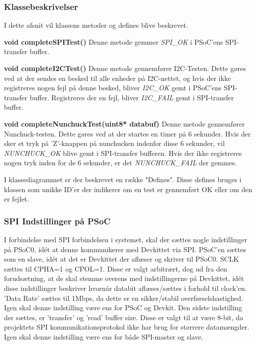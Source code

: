 \subsubsection{Klassebeskrivelser}
I dette afsnit vil klassens metoder og defines blive beskrevet.
\newline

\noindent\textbf{void completeSPITest()} \newline
Denne metode gemmer \textit{SPI\_OK} i PSoC'ens SPI-transfer buffer. \newline

\noindent\textbf{void completeI2CTest()} \newline
Denne metode gennemfører I2C-Testen. Dette gøres ved at der sendes en besked til alle enheder på I2C-nettet, og hvis der ikke registreres nogen fejl på denne besked, bliver \textit{I2C\_OK} gemt i PSoC'ens SPI-transfer buffer. Registreres der en fejl, bliver \textit{I2C\_FAIL} gemt i SPI-transfer buffer. \newline

\noindent\textbf{void completeNunchuckTest(uint8* databuf)} \newline
Denne metode gennemfører Nunchuck-testen. Dette gøres ved at der startes en timer på 6 sekunder. Hvis der sker et tryk på 'Z'-knappen på nunchucken indenfor disse 6 sekunder, vil \textit{NUNCHUCK\_OK} blive gemt i SPI-transfer bufferen. Hvis der ikke registreres nogen tryk inden for de 6 sekunder, er det \textit{NUNCHUCK\_FAIL} der gemmes.\newline

I klassediagrammet er der beskrevet en række "Defines". Disse defines bruges i klassen som unikke ID'er der indikerer om en test er gennemført OK eller om den er fejlet.

\subsubsection{SPI Indstillinger på PSoC}
I forbindelse med SPI forbindelsen i systemet, skal der sættes nogle indstillinger på PSoC0, idét at denne kommunikerer med Devkittet via SPI. 
PSoC'en sættes som en slave, idét at det er Devkittet der aflæser og skriver til PSoC0.
SCLK sættes til CPHA=1 og CPOL=1. Disse er valgt arbitrært, dog ud fra den forudsætning, at de skal stemme overens med indstillingerne på Devkittet, idét disse indstillinger beskriver hvornår databit aflæses/sættes i forhold til clock'en. 
'Data Rate' sættes til 1Mbps, da dette er en sikker/stabil overførselshastighed. Igen skal denne indstilling være ens for PSoC og Devkit.
Den sidste indstilling der sættes, er 'transfer' og 'read' buffer size. Disse er valgt til at være 8-bit, da projektets SPI kommunikationsprotokol ikke har brug for størrere datamængder. Igen skal denne indstilling være ens for både SPI-master og slave. 

